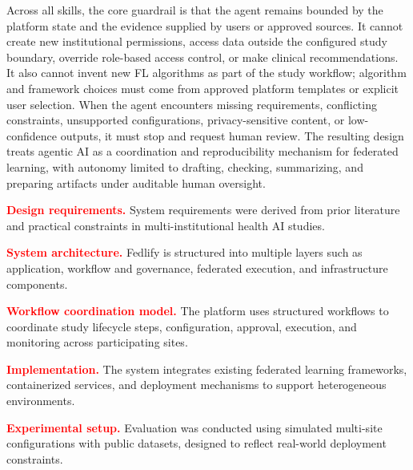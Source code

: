 \documentclass[preprint,5p, 10pt, times]{elsarticle}
\begin{document}
Across all skills, the core guardrail is that the agent remains bounded by the platform state and the evidence supplied by users or approved sources. 
It cannot create new institutional permissions, access data outside the configured study boundary, override role-based access control, or make clinical recommendations. 
It also cannot invent new FL algorithms as part of the study workflow; algorithm and framework choices must come from approved platform templates or explicit user selection. 
When the agent encounters missing requirements, conflicting constraints, unsupported configurations, privacy-sensitive content, or low-confidence outputs, it must stop and request human review. 
The resulting design treats agentic AI as a coordination and reproducibility mechanism for federated learning, with autonomy limited to drafting, checking, summarizing, and preparing artifacts under auditable human oversight.


\textcolor{red}{\textbf{Design requirements.}} System requirements were derived from prior literature and practical constraints in multi-institutional health AI studies.

\textcolor{red}{\textbf{System architecture.}} Fedlify is structured into multiple layers such as application, workflow and governance, federated execution, and infrastructure components.

\textcolor{red}{\textbf{Workflow coordination model.}} The platform uses structured workflows to coordinate study lifecycle steps, configuration, approval, execution, and monitoring across participating sites.

\textcolor{red}{\textbf{Implementation.}} The system integrates existing federated learning frameworks, containerized services, and deployment mechanisms to support heterogeneous environments.

\textcolor{red}{\textbf{Experimental setup.}} Evaluation was conducted using simulated multi-site configurations with public datasets, designed to reflect real-world deployment constraints.





{\footnotesize
}
\end{document}
